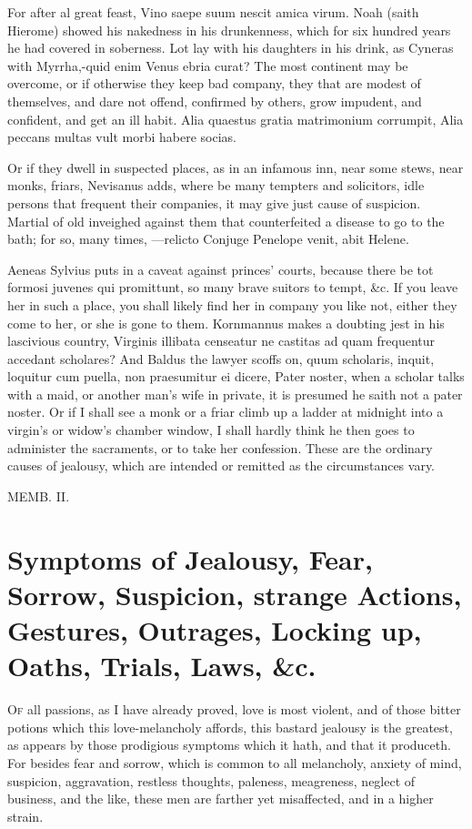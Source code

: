 {For after al great feast, Vino saepe suum nescit amica virum.
Noah (saith Hierome) showed his nakedness in his drunkenness,
which for six hundred years he had covered in soberness. Lot lay with
his daughters in his drink, as Cyneras with Myrrha,-quid enim
Venus ebria curat? The most continent may be overcome, or if otherwise
they keep bad company, they that are modest of themselves, and dare not
offend, confirmed by others, grow impudent, and confident, and
get an ill habit.
Alia quaestus gratia matrimonium corrumpit,
Alia peccans multas vult morbi habere socias.

Or if they dwell in suspected places, as in an infamous inn, near some
stews, near monks, friars, Nevisanus adds, where be many tempters and
solicitors, idle persons that frequent their companies, it may give
just cause of suspicion. Martial of old inveighed against them that
counterfeited a disease to go to the bath; for so, many times,
---relicto
Conjuge Penelope venit, abit Helene.

Aeneas Sylvius puts in a caveat against princes' courts, because there
be tot formosi juvenes qui promittunt, so many brave suitors to tempt,
\&c. If you leave her in such a place, you shall likely find her
in company you like not, either they come to her, or she is gone to
them. Kornmannus makes a doubting jest in his lascivious country,
Virginis illibata censeatur ne castitas ad quam frequentur accedant
scholares? And Baldus the lawyer scoffs on, quum scholaris, inquit,
loquitur cum puella, non praesumitur ei dicere, Pater noster, when a
scholar talks with a maid, or another man's wife in private, it is
presumed he saith not a pater noster. Or if I shall see a monk or a
friar climb up a ladder at midnight into a virgin's or widow's chamber
window, I shall hardly think he then goes to administer the sacraments,
or to take her confession. These are the ordinary causes of jealousy,
which are intended or remitted as the circumstances vary.

MEMB. II.

\section[Symptoms of Jealousy]{Symptoms of Jealousy, Fear, Sorrow, Suspicion, strange Actions, Gestures, Outrages, Locking up, Oaths, Trials, Laws, \&c.}

\lettrine{O}{f} all passions, as I have already proved, love is most violent, and of
those bitter potions which this love-melancholy affords, this bastard
jealousy is the greatest, as appears by those prodigious symptoms which
it hath, and that it produceth. For besides fear and sorrow, which is
common to all melancholy, anxiety of mind, suspicion, aggravation,
restless thoughts, paleness, meagreness, neglect of business, and the
like, these men are farther yet misaffected, and in a higher strain.

}
